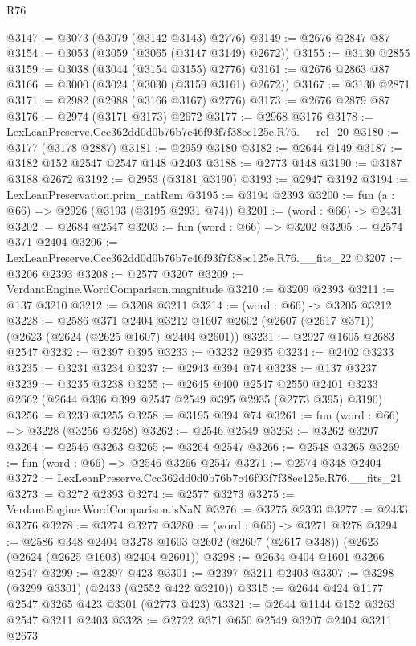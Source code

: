 \begin{lexlean}{R76}
\begin{coremodule}
@3147 := @3073 (@3079 (@3142 @3143) @2776)
@3149 := @2676 @2847 @87
@3154 := @3053 (@3059 (@3065 (@3147 @3149) @2672))
@3155 := @3130 @2855
@3159 := @3038 (@3044 (@3154 @3155) @2776)
@3161 := @2676 @2863 @87
@3166 := @3000 (@3024 (@3030 (@3159 @3161) @2672))
@3167 := @3130 @2871
@3171 := @2982 (@2988 (@3166 @3167) @2776)
@3173 := @2676 @2879 @87
@3176 := @2974 (@3171 @3173) @2672
@3177 := @2968 @3176
@3178 := LexLeanPreserve.Ccc362dd0d0b76b7c46f93f7f38ec125e.R76.__rel_20
@3180 := @3177 (@3178 @2887)
@3181 := @2959 @3180
@3182 := @2644 @149
@3187 := @3182 @152 @2547 @2547 @148 @2403
@3188 := @2773 @148
@3190 := @3187 @3188 @2672
@3192 := @2953 (@3181 @3190)
@3193 := @2947 @3192
@3194 := LexLeanPreservation.prim_natRem
@3195 := @3194 @2393
@3200 := fun (a : @66) => @2926 (@3193 (@3195 @2931 @74))
@3201 := (word : @66) -> @2431
@3202 := @2684 @2547
@3203 := fun (word : @66) => @3202
@3205 := @2574 @371 @2404
@3206 := LexLeanPreserve.Ccc362dd0d0b76b7c46f93f7f38ec125e.R76.__fits_22
@3207 := @3206 @2393
@3208 := @2577 @3207
@3209 := VerdantEngine.WordComparison.magnitude
@3210 := @3209 @2393
@3211 := @137 @3210
@3212 := @3208 @3211
@3214 := (word : @66) -> @3205 @3212
@3228 := @2586
    @371
    @2404
    @3212
    @1607
    @2602
    (@2607 (@2617 @371))
    (@2623 (@2624 (@2625 @1607) @2404 @2601))
@3231 := @2927 @1605 @2683 @2547
@3232 := @2397 @395
@3233 := @3232 @2935
@3234 := @2402 @3233
@3235 := @3231 @3234
@3237 := @2943 @394 @74
@3238 := @137 @3237
@3239 := @3235 @3238
@3255 := @2645
    @400
    @2547
    @2550
    @2401
    @3233
    @2662
    (@2644 @396 @399 @2547 @2549 @395 @2935 (@2773 @395) @3190)
@3256 := @3239 @3255
@3258 := @3195 @394 @74
@3261 := fun (word : @66) => @3228 (@3256 @3258)
@3262 := @2546 @2549
@3263 := @3262 @3207
@3264 := @2546 @3263
@3265 := @3264 @2547
@3266 := @2548 @3265
@3269 := fun (word : @66) => @2546 @3266 @2547
@3271 := @2574 @348 @2404
@3272 := LexLeanPreserve.Ccc362dd0d0b76b7c46f93f7f38ec125e.R76.__fits_21
@3273 := @3272 @2393
@3274 := @2577 @3273
@3275 := VerdantEngine.WordComparison.isNaN
@3276 := @3275 @2393
@3277 := @2433 @3276
@3278 := @3274 @3277
@3280 := (word : @66) -> @3271 @3278
@3294 := @2586
    @348
    @2404
    @3278
    @1603
    @2602
    (@2607 (@2617 @348))
    (@2623 (@2624 (@2625 @1603) @2404 @2601))
@3298 := @2634 @404 @1601 @3266 @2547
@3299 := @2397 @423
@3301 := @2397 @3211 @2403
@3307 := @3298 (@3299 @3301) (@2433 (@2552 @422 @3210))
@3315 := @2644 @424 @1177 @2547 @3265 @423 @3301 (@2773 @423)
@3321 := @2644 @1144 @152 @3263 @2547 @3211 @2403
@3328 := @2722 @371 @650 @2549 @3207 @2404 @3211 @2673

\end{coremodule}
\end{lexlean}
